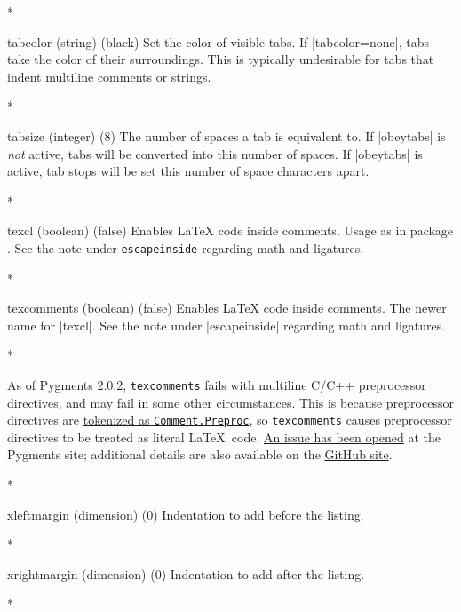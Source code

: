 \begin{paracol}{2}
\begin{optionlist}
\switchcolumn[0]*%

\item[tabcolor (string) (black)]
Set the color of visible tabs.  If |tabcolor=none|, tabs take the color of their surroundings.  This is typically undesirable for tabs that indent multiline comments or strings.
\switchcolumn

\switchcolumn[0]*%

  \item[tabsize (integer) (8)]
    The number of spaces a tab is equivalent to.  If |obeytabs| is \emph{not} active, tabs will be converted into this number of spaces.  If |obeytabs| is active, tab stops will be set this number of space characters apart.
    \switchcolumn

\switchcolumn[0]*%
  \item[texcl (boolean) (false)]
    Enables \LaTeX{} code inside comments.
    Usage as in package .  See the note under \texttt{escapeinside} regarding math and ligatures.
    \switchcolumn

\switchcolumn[0]*%
  \item[texcomments (boolean) (false)]
    Enables \LaTeX{} code inside comments.  The newer name for |texcl|.  See the note under |escapeinside| regarding math and ligatures.
    \switchcolumn

\switchcolumn[0]*%

    As of Pygments 2.0.2, \texttt{texcomments} fails with multiline C/C++ preprocessor directives, and may fail in some other circumstances.  This is because preprocessor directives are \href{http://pygments.org/docs/tokens/}{tokenized as \texttt{Comment.Preproc}}, so \texttt{texcomments} causes preprocessor directives to be treated as literal \LaTeX\ code.  \href{https://bitbucket.org/birkenfeld/pygments-main/issue/1086/wrong-processing-of-in-c-c-macros-if-is}{An issue has been opened} at the Pygments site; additional details are also available on the \href{https://github.com/gpoore/minted/issues/66}{ GitHub site}.
    \switchcolumn

\switchcolumn[0]*%
  \item[xleftmargin (dimension) (0)]
    Indentation to add before the listing.
    \switchcolumn

\switchcolumn[0]*%
  \item[xrightmargin (dimension) (0)]
    Indentation to add after the listing.
    \switchcolumn

\switchcolumn[0]*%

\end{optionlist}



\end{paracol}